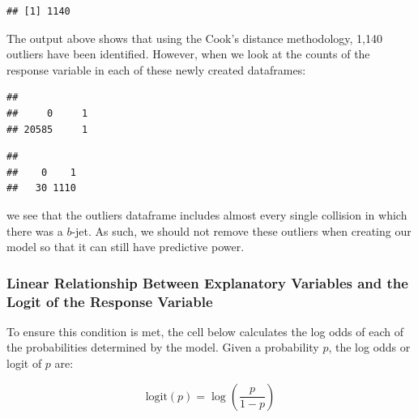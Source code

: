 \documentclass[
]{article}
\newenvironment{Shaded}{\begin{snugshade}}{\end{snugshade}}
\newcommand{\FunctionTok}[1]{\textcolor[rgb]{0.00,0.00,0.00}{#1}}
\newcommand{\NormalTok}[1]{#1}
\newcommand{\SpecialCharTok}[1]{\textcolor[rgb]{0.00,0.00,0.00}{#1}}
\begin{document}
\begin{verbatim}
## [1] 1140
\end{verbatim}

The output above shows that using the Cook's distance methodology, 1,140
outliers have been identified. However, when we look at the counts of
the response variable in each of these newly created dataframes:

\begin{Shaded}
\end{Shaded}

\begin{verbatim}
## 
##     0     1 
## 20585     1
\end{verbatim}

\begin{Shaded}
\end{Shaded}

\begin{verbatim}
## 
##    0    1 
##   30 1110
\end{verbatim}

we see that the outliers dataframe includes almost every single
collision in which there was a \(b\)-jet. As such, we should not remove
these outliers when creating our model so that it can still have
predictive power.

\hypertarget{linear-relationship-between-explanatory-variables-and-the-logit-of-the-response-variable}{%
\subsubsection{Linear Relationship Between Explanatory Variables and the
Logit of the Response
Variable}\label{linear-relationship-between-explanatory-variables-and-the-logit-of-the-response-variable}}

To ensure this condition is met, the cell below calculates the log odds
of each of the probabilities determined by the model. Given a
probability \(p\), the log odds or logit of \(p\) are:

\[
\begin{equation}
\text{logit}(p) = \log \left( \frac{p}{1-p} \right)
\end{equation}
\]
\end{document}
